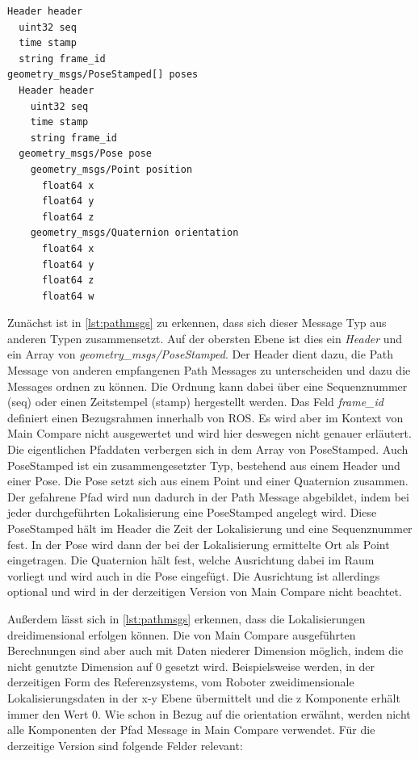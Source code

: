 \begin{lstlisting}[caption=ROS Path Message, label=lst:pathmsgs]
Header header
  uint32 seq
  time stamp
  string frame_id
geometry_msgs/PoseStamped[] poses
  Header header
    uint32 seq
    time stamp
    string frame_id
  geometry_msgs/Pose pose
    geometry_msgs/Point position
      float64 x
      float64 y
      float64 z
    geometry_msgs/Quaternion orientation
      float64 x
      float64 y
      float64 z
      float64 w
\end{lstlisting}

Zunächst ist in \autoref{lst:pathmsgs} zu erkennen, dass sich dieser Message Typ aus anderen Typen
zusammensetzt. Auf der obersten Ebene ist dies ein
\textit{Header} und ein Array von \textit{geometry\_msgs/PoseStamped}.
Der Header dient dazu, die Path Message von anderen empfangenen
Path Messages zu unterscheiden und dazu die Messages ordnen zu können. Die Ordnung kann dabei über eine Sequenznummer
(seq) oder einen Zeitstempel (stamp) hergestellt werden. Das Feld
\textit{frame\_id}
definiert einen Bezugsrahmen innerhalb von ROS. Es wird aber im Kontext von
Main Compare nicht ausgewertet und wird hier deswegen nicht genauer erläutert.
Die eigentlichen Pfaddaten verbergen sich in dem Array von PoseStamped. Auch
PoseStamped ist ein zusammengesetzter Typ, bestehend aus einem Header und einer
Pose. Die Pose setzt sich aus einem Point und einer Quaternion zusammen.
Der gefahrene Pfad wird nun dadurch in der Path Message abgebildet, indem bei
jeder durchgeführten Lokalisierung eine PoseStamped angelegt wird. Diese PoseStamped
hält im Header die Zeit der Lokalisierung und eine Sequenznummer fest. In der
Pose wird dann der bei der Lokalisierung ermittelte Ort als Point eingetragen. Die Quaternion
hält fest, welche Ausrichtung dabei im Raum vorliegt und wird auch
in die Pose eingefügt. Die Ausrichtung ist
allerdings optional und wird in der derzeitigen Version von Main Compare nicht beachtet. 

Außerdem lässt sich in \autoref{lst:pathmsgs} erkennen, dass die
Lokalisierungen dreidimensional erfolgen können. Die von Main Compare
ausgeführten Berechnungen sind aber auch mit Daten niederer Dimension möglich,
indem die nicht genutzte Dimension auf 0 gesetzt wird. Beispielsweise werden,
in der derzeitigen Form des Referenzsystems, vom Roboter zweidimensionale
Lokalisierungsdaten in der x-y Ebene übermittelt und die z Komponente erhält
immer den Wert 0. Wie schon in Bezug auf die orientation erwähnt, werden nicht alle Komponenten der
Pfad Message in Main Compare verwendet. Für die derzeitige Version sind
folgende Felder relevant:

